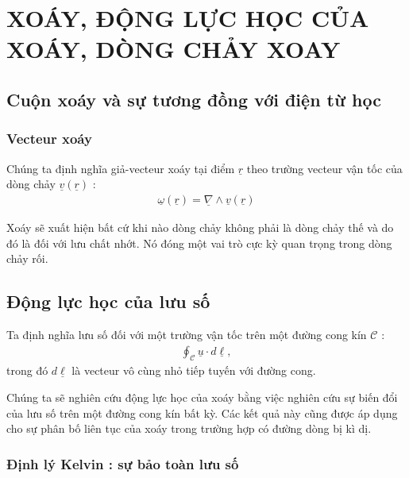 \documentclass[THUY_DONG_HOC.tex]{subfiles}
\begin{document}
\chapter{XOÁY, ĐỘNG LỰC HỌC CỦA XOÁY, DÒNG CHẢY XOAY}
\section{Cuộn xoáy và sự tương đồng với điện từ học}
\subsection{Vecteur xoáy}

Chúng ta định nghĩa giả-vecteur xoáy tại điểm $\underline{r}$ theo trường vecteur vận tốc của dòng chảy $\underline{v}(\underline{r})$ :
\begin{equation}
	\begin{aligned}
		\underline{\omega}(\underline{r})=\underline{\nabla}\wedge\underline{v}(\underline{r})
	\end{aligned}
\end{equation}

Xoáy sẽ xuất hiện bất cứ khi nào dòng chảy không phải là dòng chảy thế và do đó là đối với lưu chất nhớt. Nó đóng một vai trò cực kỳ quan trọng trong dòng chảy rối.

\section{Động lực học của lưu số}
Ta định nghĩa lưu số đối với một trường vận tốc trên một đường cong kín $\mathscr{C}$ :
\begin{equation}
	\begin{aligned}
		\oint_\mathscr{C} \underline{u}\cdot d\underline{\ell},
	\end{aligned}
\end{equation}
trong đó $d\underline{\ell}$ là vecteur vô cùng nhỏ tiếp tuyến với đường cong.

Chúng ta sẽ nghiên cứu động lực học của xoáy bằng việc nghiên cứu sự biến đổi của lưu số trên một đường cong kín bất kỳ. Các kết quả này cũng được áp dụng cho sự phân bố liên tục của xoáy trong trường hợp có đường dòng bị kì dị.

\subsection{Định lý Kelvin : sự bảo toàn lưu số}
\end{document}

